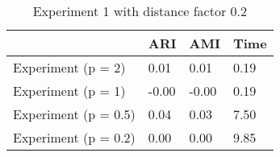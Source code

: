 \begin{table}
\centering
\caption{Experiment 1 with distance factor 0.2}
\begin{tabular}{llll}
\toprule
{} &    ARI &    AMI &  Time \\
\midrule
Experiment (p = 2)   &   0.01 &   0.01 &  0.19 \\
Experiment (p = 1)   &  -0.00 &  -0.00 &  0.19 \\
Experiment (p = 0.5) &   0.04 &   0.03 &  7.50 \\
Experiment (p = 0.2) &   0.00 &   0.00 &  9.85 \\
\bottomrule
\end{tabular}
\end{table}
